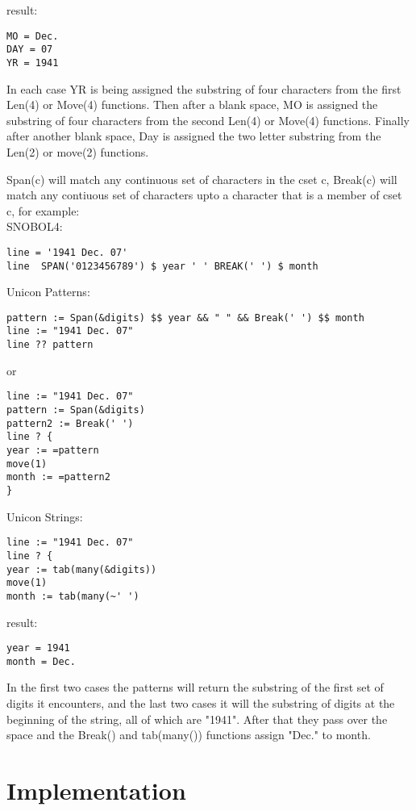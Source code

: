 \documentclass{article}
\begin{document}
\noindent
result:
\begin{verbatim}
MO = Dec.
DAY = 07
YR = 1941
\end{verbatim}

In each case YR is being assigned the substring of four characters from the first Len(4) or Move(4) functions.  Then after a blank space, MO is assigned the substring of four characters from the second Len(4) or Move(4) functions.  Finally after another blank space, Day is assigned the two letter substring from the Len(2) or move(2) functions.

\pagebreak
Span(c) will match any continuous set of characters in the cset c, Break(c) will match any contiuous set of characters upto a character that is a member of cset c, for example:\\

\noindent
SNOBOL4:
\begin{verbatim}
line = '1941 Dec. 07'
line  SPAN('0123456789') $ year ' ' BREAK(' ') $ month
\end{verbatim}

\noindent
Unicon Patterns:
\begin{verbatim}
pattern := Span(&digits) $$ year && " " && Break(' ') $$ month
line := "1941 Dec. 07"
line ?? pattern
\end{verbatim}
or
\begin{verbatim}
line := "1941 Dec. 07"
pattern := Span(&digits)
pattern2 := Break(' ')
line ? {
year := =pattern
move(1)
month := =pattern2
}
\end{verbatim}

\noindent
Unicon Strings:
\begin{verbatim}
line := "1941 Dec. 07"
line ? {
year := tab(many(&digits))
move(1)
month := tab(many(~' ')
\end{verbatim}

\noindent
result:
\begin{verbatim}
year = 1941
month = Dec.
\end{verbatim}

In the first two cases the patterns will return the substring of the first set of digits it encounters, and the last two cases it will the substring of digits at the beginning of the string, all of which are "1941".  After that they pass over the space and the Break() and tab(many()) functions assign "Dec." to month.

\pagebreak


\section{Implementation}

\pagebreak


\end{document}

